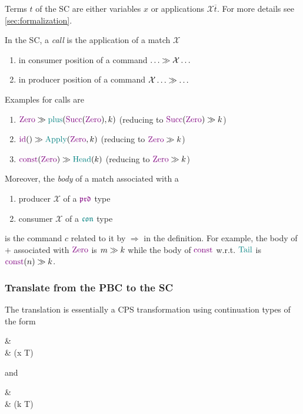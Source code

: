 Terms $t$ of the SC are either variables $x$ or applications $\mathcal{X}\overline{t}$.
For more details see \cref{sec:formalization}.

In the SC, a \textit{call} is the application of a match $\mathcal{X}$
\begin{enumerate}
  \item
    in consumer position of a command $\ldots \mathrel{\gg} \mathcal{X}\ldots$
  \item
    in producer position of a command $\mathcal{X}\ldots \mathrel{\gg} \ldots$
\end{enumerate}
Examples for calls are
\begin{enumerate}
  \item
    $\Zero \mkCmd \plus(\Succ(\Zero), k)$ (reducing to $\Succ(\Zero) \mkCmd k$)
  \item
    $\id() \mkCmd \Apply(\Zero, k)$ (reducing to $\Zero \mkCmd k$)
  \item
    $\const(\Zero) \mkCmd \Head(k)$ (reducing to $\Zero \mkCmd k$)
\end{enumerate}
Moreover, the \textit{body} of a match associated with a 
\begin{enumerate}
  \item
    producer $\mathcal{X}$ of a $\polprd$ type
  \item
    consumer $\mathcal{X}$ of a $\polcon$ type
\end{enumerate}
is the command $c$ related to it by $\Rightarrow$ in the definition.
For example, the body of $\plus$ associated with $\Zero$ is $m \mathrel{\gg} k$ while the body of $\const$ w.r.t. $\Tail$ is $\const(n) \mkCmd k$.

\subsubsection{Translate from the PBC to the SC}
The translation is essentially a CPS transformation using continuation types of the form

\begin{codealign}
  &
    \polcon\ \type\ \ContT\ \where
  \\[-4pt]
  &\quad
    \Jump(x \prd T)
\end{codealign}

and

\begin{codealign}
  &
    \polprd\ \type\ \CocontT\ \where
  \\[-4pt]
  &\quad
    \Cojump(k \con T)
\end{codealign}

